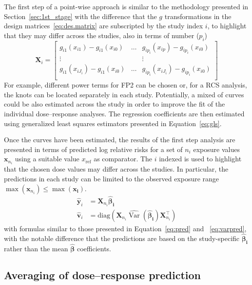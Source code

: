 \documentclass[11pt,a4paper,twoside,openany]{book}\usepackage{knitr}
\DeclareMathOperator{\Var}{Var}
\begin{document}
{The first step of a point-wise approach is similar to the methodology presented in Section~\ref{sec:1st_stage} with the difference that the $g$ transformations in the design matrices~\ref{eq:des.matrix} are subscripted by the study index $i$, to highlight that they may differ across the studies, also in terms of number ($p_i$) 
\begin{equation}
 \mathbf{X}_i=\left[
\begin{array}{ccc}
g_{i1}(x_{i1}) - g_{i1}(x_{i0}) & \hdots & g_{ip_i}(x_{ip}) - g_{ip_i}(x_{i0}) \\
\vdots &  & \vdots \\
g_{i1}(x_{iJ_i}) -  g_{i1}(x_{i0}) & \hdots & g_{ip_i}(x_{iJ_i}) -  g_{ip_i}(x_{i0}) \\
\end{array}
\right] 
\label{eq:des.matrix_pwa}
\end{equation}
\noindent For example, different power terms for FP2 can be chosen or, for a RCS analysis, the knots can be located separately in each study. Potentially, a mixed of curves could be also estimated across the study in order to improve the fit of the individual dose--response analyses. The regression coefficients are then estimated using generalized least squares estimators presented in Equation~\ref{eq:gls}.

Once the curves have been estimated, the results of the first step analysis are presented in terms of predicted log relative risks for a set of $n_i$ exposure values $\mathbf{x}_{n_i}$ using a suitable value $x_\mathrm{ref}$ as comparator. The $i$ indexed is used to highlight that the chosen dose values may differ across the studies. In particular, the predictions in each study can be limited to the observed exposure range $\max \left( \mathbf{x}_{n_i} \right) \le \max \left( \mathbf{x_i} \right)$.
\begin{align}
\hat {\boldsymbol y}_i &= \mathbf{X}_{n_i} \boldsymbol{\hat \beta_i}
\label{eq:pred_pwa} \\
\hat{\boldsymbol{v}}_i &= \mathrm{diag}\left( \mathbf{X}_{n_i} \widehat{\Var} \left( \boldsymbol{\hat \beta_i} \right) \mathbf{X}_{n_i}^\top \right)
\label{eq:predv_pwa}
\end{align}
\noindent with formulas similar to those presented in Equation~\ref{eq:pred} and ~\ref{eq:varpred}, with the notable difference that the predictions are based on the study-specific $\boldsymbol{\hat \beta_i}$ rather than the mean $\boldsymbol{\hat \beta}$ coefficients.

\subsection{Averaging of dose--response prediction}

}
\end{document}
